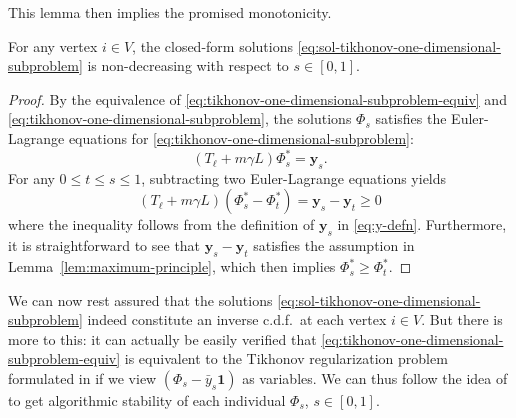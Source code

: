 \documentclass[letterpaper]{article} %
\begin{document}
This lemma then implies the promised monotonicity.  
\begin{proposition}\label{Propo:Non_Decreasing}
  For any vertex $i\in V$, the closed-form solutions \eqref{eq:sol-tikhonov-one-dimensional-subproblem} is non-decreasing with respect to $s\in \left[ 0,1 \right]$.
\end{proposition}
\begin{proof}
  By the equivalence of \eqref{eq:tikhonov-one-dimensional-subproblem-equiv} and \eqref{eq:tikhonov-one-dimensional-subproblem}, the solutions $\Phi_s$ satisfies the Euler-Lagrange equations for \eqref{eq:tikhonov-one-dimensional-subproblem}:
  \begin{equation*}
    \left( T_{\ell}+m\gamma L \right)\Phi_s^{*}=\mathbf{y}_s.
  \end{equation*}
  For any $0\leq t\leq s\leq 1$, subtracting two Euler-Lagrange equations yields
  \begin{equation*}
    \left( T_{\ell}+m\gamma L \right)\left(\Phi_s^{*}-\Phi_t^{*}\right)=\mathbf{y}_s-\mathbf{y}_t\geq 0
  \end{equation*}
  where the inequality follows from the definition of $\mathbf{y}_s$ in \eqref{eq:y-defn}. Furthermore, it is straightforward to see that $\mathbf{y}_s-\mathbf{y}_t$ satisfies the assumption in Lemma~\ref{lem:maximum-principle}, which then implies $\Phi_s^{*}\geq \Phi_t^{*}$.
\end{proof}

We can now rest assured that the solutions \eqref{eq:sol-tikhonov-one-dimensional-subproblem} indeed constitute an inverse c.d.f.\ at each vertex $i\in V$. But there is more to this: it can actually be easily verified that \eqref{eq:tikhonov-one-dimensional-subproblem-equiv} is equivalent to the Tikhonov regularization problem formulated in \cite{Belkin2004} if we view $\left(\Phi_s-\bar{y}_s\mathbf{1}\right)$ as variables. We can thus follow the idea of \cite[Theorem 5]{Belkin2004} to get algorithmic stability of each individual $\Phi_s$, $s\in \left[ 0,1 \right]$.
\end{document}
